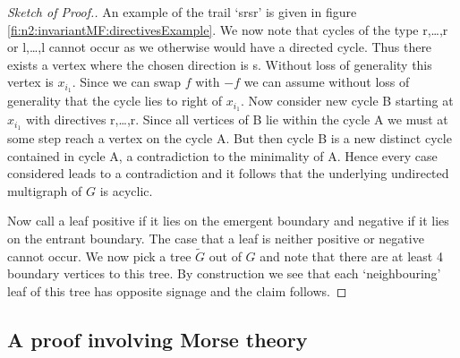 \begin{proof}[Sketch of Proof.]
  An example of the trail `srsr' is given in figure \ref{fi:n2:invariantMF:directivesExample}.
  We now note that cycles of the type r,\dots,r or l,\dots,l
  cannot occur as we otherwise would have a directed cycle. Thus there exists a vertex where the chosen direction is s. 
  Without loss of generality this vertex is $x_{i_1}$.
  Since we can swap $f$ with $-f$ we can assume without loss of generality that the cycle lies to right of $x_{i_1}$.
  Now consider new cycle B starting at $x_{i_1}$ with directives r,\dots,r.
  Since all vertices of B lie within the cycle A we must at some step reach a vertex on the cycle A. But then cycle B is a new distinct cycle
  contained in cycle A, a contradiction to the minimality of A.
  Hence every case considered leads to a contradiction and it follows that the underlying undirected multigraph of $G$
  is acyclic.
  
  Now call a leaf positive if it lies on the emergent boundary and
  negative if it lies on the entrant boundary. The case that a leaf is neither positive or negative cannot occur.
  We now pick a tree $\widetilde{G}$ out of $G$ and note that
  there are at least 4 boundary vertices to this tree.
  By construction we see that each `neighbouring' leaf of this tree
  has opposite signage and the claim follows.
\end{proof}

\subsection{A proof involving Morse theory}


